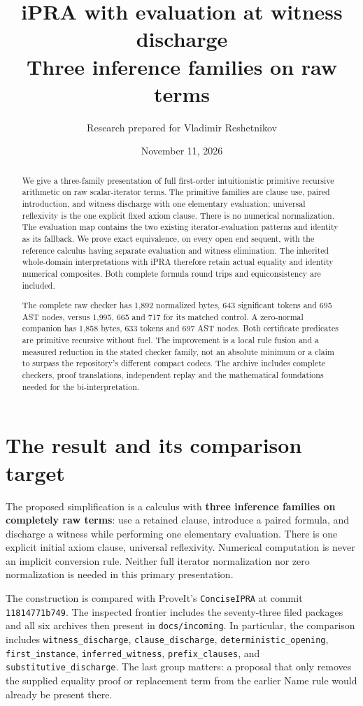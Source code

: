 \documentclass[11pt,letterpaper]{article}
\title{\color{ink}iPRA with evaluation at witness discharge\\[7pt]
\large Three inference families on raw terms}
\author{Research prepared for Vladimir Reshetnikov}
\date{November 11, 2026}
\theoremstyle{definition}\newtheorem{definition}[theorem]{Definition}
\theoremstyle{remark}\newtheorem{remark}[theorem]{Remark}
\begin{document}
\maketitle
\begin{abstract}
We give a three-family presentation of full first-order intuitionistic
primitive recursive arithmetic on raw scalar-iterator terms. The primitive
families are clause use, paired introduction, and witness discharge with
one elementary evaluation; universal reflexivity is the one explicit fixed
axiom clause. There is no numerical normalization. The evaluation map
contains the two existing iterator-evaluation patterns and identity as its
fallback. We prove exact equivalence, on every open end sequent, with the
reference calculus having separate evaluation and witness elimination.
The inherited whole-domain interpretations with iPRA therefore retain
actual equality and identity numerical composites. Both complete formula
round trips and equiconsistency are included.

The complete raw checker has 1,892 normalized bytes, 643 significant tokens
and 695 AST nodes, versus 1,995, 665 and 717 for its matched control.
A zero-normal companion has 1,858 bytes, 633 tokens and 697 AST nodes.
Both certificate predicates are primitive recursive without fuel.
The improvement is a local rule fusion and a measured reduction in the
stated checker family, not an absolute minimum or a claim to surpass the
repository's different compact codecs. The archive includes complete
checkers, proof translations, independent replay and the mathematical
foundations needed for the bi-interpretation.
\end{abstract}
\clearpage
\tableofcontents
\clearpage
\section{The result and its comparison target}
\label{sec:result}

The proposed simplification is a calculus with \textbf{three inference
families on completely raw terms}: use a retained clause, introduce a
paired formula, and discharge a witness while performing one elementary
evaluation. There is one explicit initial axiom clause, universal
reflexivity. Numerical computation is never an implicit conversion rule.
Neither full iterator normalization nor zero normalization is needed in
this primary presentation.

The construction is compared with ProveIt's \texttt{ConciseIPRA} at commit
\texttt{11814771b749}. The inspected frontier
includes the seventy-three filed packages and all six archives then present
in \texttt{docs/incoming}. In particular, the comparison includes
\texttt{witness\_discharge}, \texttt{clause\_discharge},
\texttt{deterministic\_opening}, \texttt{first\_instance},
\texttt{inferred\_witness}, \texttt{prefix\_clauses}, and
\texttt{substitutive\_discharge}. The last group matters: a proposal that
only removes the supplied equality proof or replacement term from the
earlier Name rule would already be present there.
\end{document}
